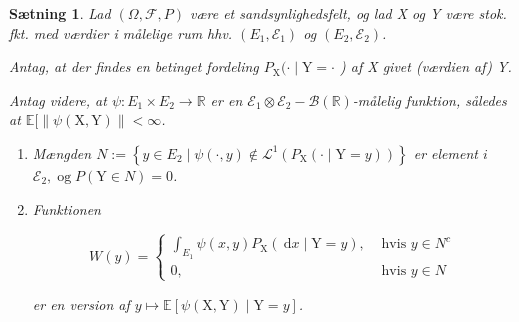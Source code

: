 \documentclass{article}
\newcommand{\1}{\mathbbm{1}}
\theoremstyle{boxed}
\newtheorem{proposition}[theorem]{Sætning}
\begin{document}
\begin{theorem-box}
    \begin{proposition}
        Lad $(\Omega, \mathcal{F}, P)$ være et sandsynlighedsfelt, og lad X og Y være stok. fkt. med værdier i målelige rum hhv. $\left(E_1, \mathcal{E}_1\right)$ og $\left(E_2, \mathcal{E}_2\right)$.

Antag, at der findes en betinget fordeling $P_{\mathrm{X}}(\cdot \mid \mathrm{Y}=\cdot$ ) af X givet (værdien af) Y.

Antag videre, at $\psi: E_1 \times E_2 \rightarrow \mathbb{R}$ er en $\mathcal{E}_1 \otimes \mathcal{E}_2-\mathcal{B}(\mathbb{R})$-målelig funktion, således at $\mathbb{E}[\|\psi(\mathrm{X}, \mathrm{Y})\|<\infty$.
\begin{enumerate}
    \item[\textnormal{(i)}] Mængden $N:=\left\{y \in E_2 \mid \psi(\cdot, y) \notin \mathcal{L}^1\left(P_{\mathrm{X}}(\cdot \mid \mathrm{Y}=y)\right)\right\}$ er element $i$ $\mathcal{E}_2, \operatorname{og} P(\mathrm{Y} \in N)=0$.
    \item[\textnormal{(ii)}]  Funktionen

$$
W(y)= \begin{cases}\int_{E_1} \psi(x, y) P_{\mathrm{X}}(\mathrm{~d} x \mid \mathrm{Y}=y), & \text { hvis } y \in N^c \\ 0, & \text { hvis } y \in N\end{cases}
$$

er en version af $y \mapsto \mathbb{E}[\psi(\mathrm{X}, \mathrm{Y}) \mid \mathrm{Y}=y]$.
\end{enumerate}
    \end{proposition}
\end{theorem-box}
\end{document}
